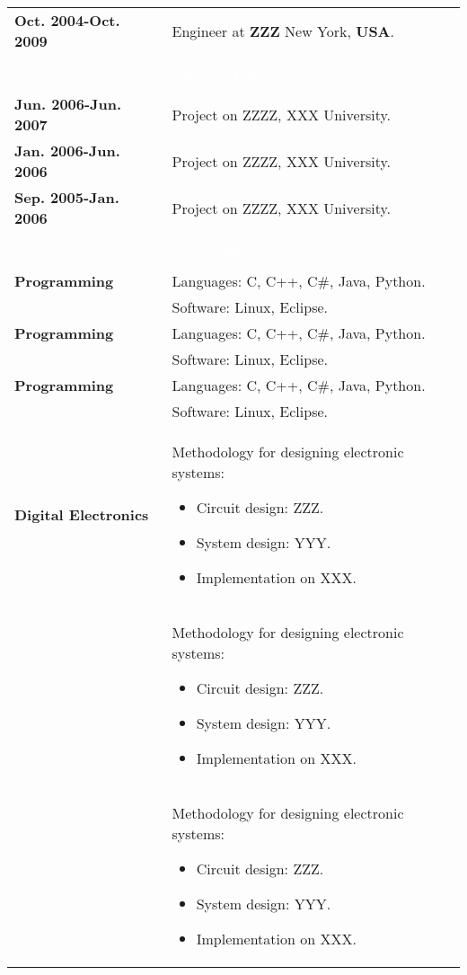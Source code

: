\documentclass[twoside,a4paper,openright,10pt]{report}
\begin{document}
\begin{table}[ht]
\begin{tabular}{p{40mm} p{140mm}}
\textbf{Oct. 2004-Oct. 2009} & Engineer at \textbf{ZZZ} New York, \textbf{USA}.\\

\\
\multicolumn{2}{c}{\cellcolor{black} \textcolor{white}{University Experience}}\\ \\

\textbf{Jun. 2006-Jun. 2007} & Project on ZZZZ, XXX University.\\
\textbf{Jan. 2006-Jun. 2006} & Project on ZZZZ, XXX University.\\
\textbf{Sep. 2005-Jan. 2006} & Project on ZZZZ, XXX University.\\

\\
\multicolumn{2}{c}{\cellcolor{black} \textcolor{white}{Skills}}\\ \\

\textbf{Programming} & Languages: C, C++, C\#, Java, Python.\\
& Software: Linux, Eclipse.\\

\textbf{Programming} & Languages: C, C++, C\#, Java, Python.\\
& Software: Linux, Eclipse.\\

\textbf{Programming} & Languages: C, C++, C\#, Java, Python.\\
& Software: Linux, Eclipse.\\

\textbf{Digital Electronics} & Methodology for designing electronic systems:
\begin{itemize}[noitemsep,nolistsep]
\item Circuit design: ZZZ.
\item System design: YYY.
\item Implementation on XXX.
\end{itemize}\\
& \vspace{-7mm} Methodology for designing electronic systems:
\begin{itemize}[noitemsep,nolistsep]
\item Circuit design: ZZZ.
\item System design: YYY.
\item Implementation on XXX.
\vspace{-4mm}
\end{itemize}\\
& Methodology for designing electronic systems:
\begin{itemize}[noitemsep,nolistsep]
\item Circuit design: ZZZ.
\item System design: YYY.
\item Implementation on XXX.
\vspace{-4mm}
\end{itemize}\\


\end{tabular}
\end{table}
\end{document}
